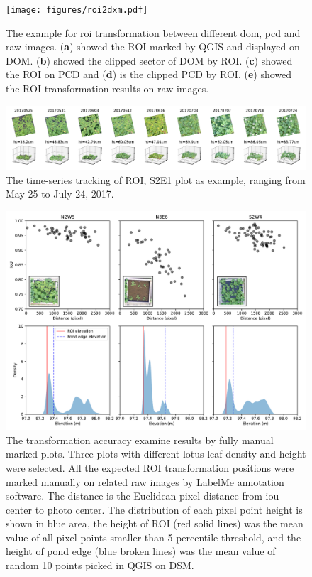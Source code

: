 \documentclass{configs/bmcart}
\begin{document}
\begin{backmatter}
\begin{figure}[!htb]
  \texttt{[image: figures/roi2dxm.pdf]}
  \caption{The example for \acrfull*{roi} transformation between different \acrfull*{dom}, \acrfull*{pcd} and raw images. (\textbf{a}) showed the ROI marked by QGIS and displayed on DOM. (\textbf{b}) showed the clipped sector of DOM by ROI. (\textbf{c}) showed the ROI on PCD and (\textbf{d}) is the clipped PCD by ROI. (\textbf{e}) showed the ROI transformation results on raw images.}
  \label{fig:roi2dxm}
\end{figure}

\begin{figure}[!htb]
  \includegraphics[width=0.95\linewidth]{figures/time_series.pdf}
  \caption{The time-series tracking of ROI, S2E1 plot as example, ranging from May 25 to July 24, 2017.}
  \label{fig:time}
\end{figure}

\begin{figure}[!htb]
  \includegraphics[width=0.95\linewidth]{figures/dist.pdf}
  \caption{The transformation accuracy examine results by fully manual marked plots. Three plots with different lotus leaf density and height were selected. All the expected ROI transformation positions were marked manually on related raw images by LabelMe annotation software. The distance is the Euclidean pixel distance from \acrfull*{iou} center to photo center. The distribution of each pixel point height is shown in blue area, the height of ROI (red solid lines) was the mean value of all pixel points smaller than 5 percentile threshold, and the height of pond edge (blue broken lines) was the mean value of random 10 points picked in QGIS on DSM.}
  \label{fig:dist}
\end{figure}


\end{backmatter}
\end{document}
